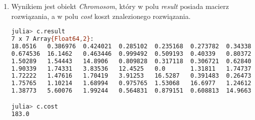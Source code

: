 \begin{enumerate}
    \item Wynikiem jest obiekt \textit{Chromosom}, który w polu \textit{result} posiada macierz rozwiązania, a w polu \textit{cost} koszt 
    znalezionego rozwiązania.
    
\begin{lstlisting}[language=bash, frame=single]
julia> c.result
7 x 7 Array{Float64,2}:
18.0516   0.386976  0.424021  0.285102  0.235168  0.273782  0.34338 
0.674536  16.1462   0.463446  0.999492  0.509193  0.40339   0.80372 
1.50289   1.54443   14.8906   0.809828  0.317118  0.306721  0.628409
1.90339   1.74331   3.83536   12.4525   0.0       1.31811   1.74737 
1.72222   1.47616   1.70419   3.91253   16.5287   0.391483  0.26473 
1.75765   1.10214   1.68994   0.975765  1.53068   16.6977   1.24612 
1.38773   5.60076   1.99244   0.564831  0.879151  0.608813  14.9663 

julia> c.cost
183.0

\end{lstlisting}

\end{enumerate}

